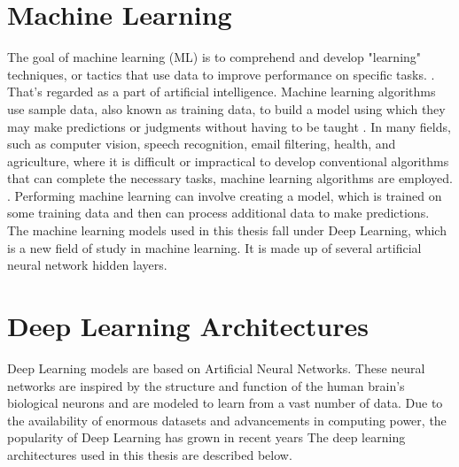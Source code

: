 \section{Machine Learning}
The goal of machine learning (ML) is to comprehend and develop "learning" techniques, or tactics that use data to improve performance on specific tasks. . That's regarded as a part of artificial intelligence. Machine learning algorithms use sample data, also known as training data, to build a model using which they may make predictions or judgments without having to be taught . In many fields, such as computer vision, speech recognition, email filtering, health, and agriculture, where it is difficult or impractical to develop conventional algorithms that can complete the necessary tasks, machine learning algorithms are employed.
 . Performing machine learning can involve creating a model, which is trained on some training data and then can process additional data to make predictions. The machine learning models used in this thesis fall under Deep Learning, which is a new field of study in machine learning. It is made up of several artificial neural network hidden layers. 

\section{Deep Learning Architectures}
Deep Learning models are based on Artificial Neural Networks. These neural networks are inspired by the structure and function of the human brain’s biological neurons and are modeled to learn from a vast number of data. Due to the availability of enormous datasets and advancements in computing power, the popularity of Deep Learning has grown in recent years  The deep learning architectures used in this thesis are described below.


